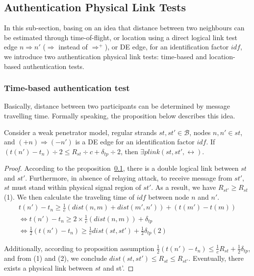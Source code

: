 \subsection{Authentication Physical Link Tests}

In this sub-section, basing on an idea that distance between two neighbours can be estimated through time-of-flight, or location using a direct logical link test edge $n \Rightarrow n'$ ($\Rightarrow$ instead of $\Rightarrow^+$), or DE edge, for an identification factor $idf$, we introduce two authentication physical link tests: time-based and location-based authentication tests.

\subsubsection*{Time-based authentication test}

Basically, distance between two participants can be determined by message travelling time. Formally speaking, the proposition below describes this idea.

\begin{Proposition}\label{difrange}
Consider a weak penetrator model, regular strands $st, st' \in \mathcal{B}$, nodes $n,n' \in st$, and $(+n) \Rightarrow (-n')$ is a DE edge for an identification factor $idf$. If $(t(n') - t_n)\div 2 \le R_{st} \div c + \delta_{tp} \div 2$, then $\exists plink(st,st',\leftrightarrow)$. 
\end{Proposition}

\begin{proof}

According to the proposition~\ref{}, there is a double logical link between $st$ and $st'$. Furthermore, in absence of relaying attack, to receive message from $st'$, $st$ must stand within physical signal region of $st'$. As a result, we have $R_{st'} \ge R_{st}$ (1). We then calculate the traveling time of $idf$ between node $n$ and $n'$. 
\begin{equation*}
\begin{split}
  	 t(n') - t_n \ge \frac 1 {c}(dist(n,m) + dist(m', n')) + (t(m') - t(m)) \\ \Leftrightarrow 
	 t(n') - t_n \ge 2 \times \frac 1 {c}(dist(n,m)) + \delta_{tp} \\ \Leftrightarrow 
	 \frac 1 {2} (t(n') - t_n) \ge \frac 1 {c} dist(st,st') + \frac 1 {2} \delta_{tp} (2)
\end{split}
\end{equation*}

Additionally, according to proposition assumption $ \frac 1 {2} (t(n') - t_n) \le \frac 1 {c} R_{st} + \frac 1 {2} \delta_{tp} $, and from (1) and (2), we conclude $dist(st,st') \le R_{st} \le R_{st'} $. Eventually, there exists a physical link between $st$ and st'.
\end{proof}

